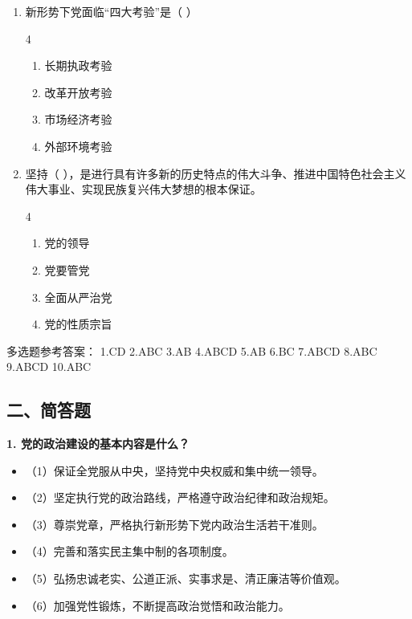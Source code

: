 \documentclass[a4paper,11pt]{ctexart}
\begin{document}
\begin{enumerate}
    \item 新形势下党面临“四大考验”是（ ）
    \begin{multicols}{4}
    \begin{enumerate}
        \item 长期执政考验
        \item 改革开放考验
        \item 市场经济考验
        \item 外部环境考验
    \end{enumerate}
    \end{multicols}

    \item 坚持（ ），是进行具有许多新的历史特点的伟大斗争、推进中国特色社会主义伟大事业、实现民族复兴伟大梦想的根本保证。
    \begin{multicols}{4}
    \begin{enumerate}
        \item 党的领导
        \item 党要管党
        \item 全面从严治党
        \item 党的性质宗旨
    \end{enumerate}
    \end{multicols}
\end{enumerate}

\begin{answerbox}
多选题参考答案：
1.CD \quad 2.ABC \quad 3.AB \quad 4.ABCD \quad 5.AB \quad 6.BC \quad 7.ABCD \quad 8.ABC \quad 9.ABCD \quad 10.ABC
\end{answerbox}

\subsection{二、简答题}
\textbf{1. 党的政治建设的基本内容是什么？}
\begin{itemize}
    \item （1）保证全党服从中央，坚持党中央权威和集中统一领导。
    \item （2）坚定执行党的政治路线，严格遵守政治纪律和政治规矩。
    \item （3）尊崇党章，严格执行新形势下党内政治生活若干准则。
    \item （4）完善和落实民主集中制的各项制度。
    \item （5）弘扬忠诚老实、公道正派、实事求是、清正廉洁等价值观。
    \item （6）加强党性锻炼，不断提高政治觉悟和政治能力。
\end{itemize}
\end{document}
